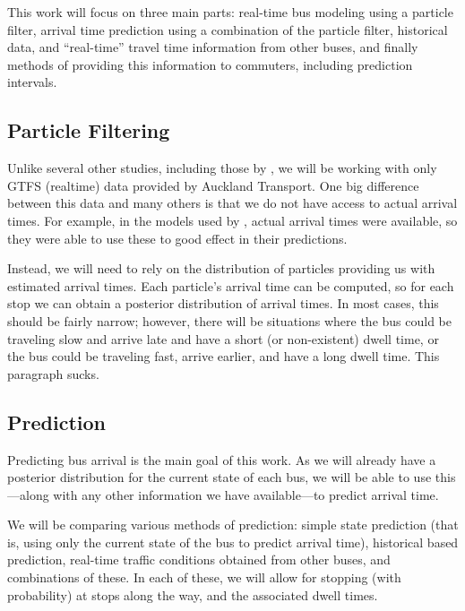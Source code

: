 \documentclass[12pt,a4paper]{article}
\begin{document}
This work will focus on three main parts:
real-time bus modeling using a particle filter,
arrival time prediction using a combination of the particle filter,
historical data, and ``real-time'' travel time information
from other buses,
and finally methods of providing this information to commuters,
including prediction intervals.


\subsection{Particle Filtering}
\label{sec:new-pf}

Unlike several other studies, including those by \cite{hans-etal:2015},
we will be working with only GTFS (realtime) data provided by Auckland Transport.
One big difference between this data and many others is that we do not have
access to actual arrival times.
For example, in the models used by \cite{hans-etal:2015},
actual arrival times were available, so they were able to use these to 
good effect in their predictions.


Instead, we will need to rely on the distribution of particles providing us
with estimated arrival times.
Each particle's arrival time can be computed, so for each stop we can obtain 
a posterior distribution of arrival times.
In most cases, this should be fairly narrow;
however, there will be situations where the bus could be traveling slow and arrive
late and have a short (or non-existent) dwell time,
or the bus could be traveling fast, arrive earlier,
and have a long dwell time.
This paragraph sucks.







\subsection{Prediction}
\label{sec:new-prediction}


Predicting bus arrival is the main goal of this work.
As we will already have a posterior distribution for the current state of
each bus, 
we will be able to use this---along with any other information we
have available---to predict arrival time.


We will be comparing various methods of prediction:
simple state prediction (that is, using only the current state of the 
bus to predict arrival time),
historical based prediction,
real-time traffic conditions obtained from other buses,
and combinations of these.
In each of these, we will allow for stopping (with probability) at stops
along the way, and the associated dwell times.
\end{document}
